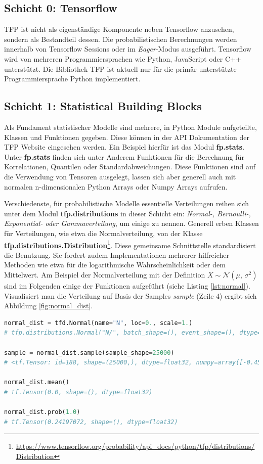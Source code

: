 \documentclass[12pt]{article}
\begin{document}
\subsection{Schicht 0: Tensorflow}
TFP ist nicht als eigenständige Komponente neben Tensorflow anzusehen, sondern als Bestandteil dessen. Die probabilistischen Berechnungen werden innerhalb von Tensorflow Sessions oder im \textit{Eager}-Modus ausgeführt. Tensorflow wird von mehreren Programmiersprachen wie Python, JavaScript oder C++ unterstützt. Die Bibliothek TFP ist aktuell nur für die primär unterstützte Programmiersprache Python implementiert.

\subsection{Schicht 1: Statistical Building Blocks}
\label{sec:buildingblocks}
Als Fundament statistischer Modelle sind mehrere, in Python Module aufgeteilte, Klassen und Funktionen gegeben. Diese können in der API Dokumentation der TFP Website eingesehen werden. Ein Beispiel hierfür ist das Modul \textbf{fp.stats}. Unter \textbf{fp.stats} finden sich unter Anderem Funktionen für die Berechnung für Korrelationen, Quantilen oder Standardabweichungen. Diese Funktionen sind auf die Verwendung von Tensoren ausgelegt, lassen sich aber generell auch mit normalen n-dimensionalen Python Arrays oder Numpy Arrays aufrufen.  

Verschiedenste, für probabilistische Modelle essentielle Verteilungen reihen sich unter dem Modul \textbf{tfp.distributions} in dieser Schicht ein: \textit{Normal-, Bernoulli-, Exponential- oder Gammaverteilung}, um einige zu nennen. Generell erben Klassen für Verteilungen, wie etwa die Normalverteilung, von der Klasse \textbf{tfp.distributions.Distribution}\footnote{\url{https://www.tensorflow.org/probability/api_docs/python/tfp/distributions/Distribution}}. Diese gemeinsame Schnittstelle standardisiert die Benutzung. Sie fordert zudem Implementationen mehrerer hilfreicher Methoden wie etwa für die logarithmische Wahrscheinlichkeit oder dem Mittelwert. Am Beispiel der Normalverteilung mit der Definition $X \sim \mathcal{N}(\mu,\,\sigma^{2})$ sind im Folgenden einige der Funktionen aufgeführt (siehe Listing \ref{lst:normal}). Visualisiert man die Verteilung auf Basis der Samples \textit{sample} (Zeile 4) ergibt sich Abbildung \ref{fig:normal_dist}.

\begin{lstlisting}[language=Python, caption={Verwendung der Klasse tfp.distributions.Normal}, label={lst:normal}]
normal_dist = tfd.Normal(name="N", loc=0., scale=1.)
# tfp.distributions.Normal("N/", batch_shape=(), event_shape=(), dtype=float32)

sample = normal_dist.sample(sample_shape=25000)
# <tf.Tensor: id=188, shape=(25000,), dtype=float32, numpy=array([-0.45733708, -0.19126031, -0.33290815, ..., -1.1285563 , -0.6958163 ,  0.552399  ], dtype=float32)>

normal_dist.mean() 
# tf.Tensor(0.0, shape=(), dtype=float32)

normal_dist.prob(1.0) 
# tf.Tensor(0.24197072, shape=(), dtype=float32)
\end{lstlisting}
\end{document}

